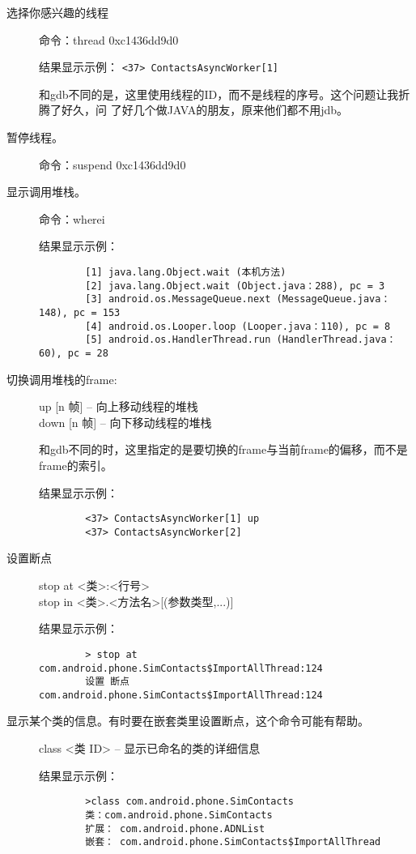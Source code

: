 \documentclass[a4paper,titlepage]{article}
\begin{document}
\begin{description}
    \item [选择你感兴趣的线程]
        命令：thread 0xc1436dd9d0

        结果显示示例：
        \verb|<37> ContactsAsyncWorker[1]|

        和gdb不同的是，这里使用线程的ID，而不是线程的序号。这个问题让我折腾了好久，问
        了好几个做JAVA的朋友，原来他们都不用jdb。

    \item [暂停线程。]
        命令：suspend 0xc1436dd9d0

    \item [显示调用堆栈。]
        命令：wherei

        结果显示示例：
        \begin{verbatim}
        [1] java.lang.Object.wait (本机方法)
        [2] java.lang.Object.wait (Object.java：288), pc = 3
        [3] android.os.MessageQueue.next (MessageQueue.java：148), pc = 153
        [4] android.os.Looper.loop (Looper.java：110), pc = 8
        [5] android.os.HandlerThread.run (HandlerThread.java：60), pc = 28
        \end{verbatim}

    \item [切换调用堆栈的frame:]
        up [n 帧] – 向上移动线程的堆栈\\
        down [n 帧] – 向下移动线程的堆栈

        和gdb不同的时，这里指定的是要切换的frame与当前frame的偏移，而不是frame的索引。

        结果显示示例：
        \begin{verbatim}
        <37> ContactsAsyncWorker[1] up
        <37> ContactsAsyncWorker[2]
        \end{verbatim}

    \item [设置断点] 
        stop at <类>:<行号>\\
        stop in <类>.<方法名>[(参数类型,...)]

        结果显示示例：
        \begin{verbatim}
        > stop at com.android.phone.SimContacts$ImportAllThread:124
        设置 断点 com.android.phone.SimContacts$ImportAllThread:124
        \end{verbatim}

    \item [显示某个类的信息。有时要在嵌套类里设置断点，这个命令可能有帮助。]
        class <类 ID> – 显示已命名的类的详细信息

        结果显示示例：
        \begin{verbatim}
        >class com.android.phone.SimContacts
        类：com.android.phone.SimContacts
        扩展： com.android.phone.ADNList
        嵌套： com.android.phone.SimContacts$ImportAllThread
        \end{verbatim}


\end{description}
\end{document}
